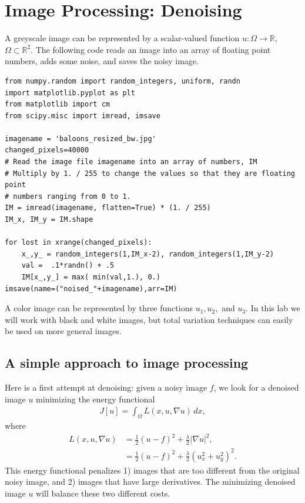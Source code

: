\section*{Image Processing: Denoising}
A greyscale image can be represented by a scalar-valued function $u:\Omega \to \mathbb{R}$, $\Omega \subset \mathbb{R}^2$. The following code reads an image into an array of floating point numbers, adds some noise, and saves the noisy image. 
\begin{lstlisting}
from numpy.random import random_integers, uniform, randn
import matplotlib.pyplot as plt
from matplotlib import cm
from scipy.misc import imread, imsave

imagename = 'baloons_resized_bw.jpg'
changed_pixels=40000
# Read the image file imagename into an array of numbers, IM
# Multiply by 1. / 255 to change the values so that they are floating point
# numbers ranging from 0 to 1.
IM = imread(imagename, flatten=True) * (1. / 255)
IM_x, IM_y = IM.shape
	
for lost in xrange(changed_pixels):
	x_,y_ = random_integers(1,IM_x-2), random_integers(1,IM_y-2)
	val =  .1*randn() + .5
	IM[x_,y_] = max( min(val,1.), 0.)
imsave(name=("noised_"+imagename),arr=IM)	
\end{lstlisting}
A color image can be represented by three functions $u_1, u_2,$ and $u_3$. In this lab we will work with black and white images, but total variation techniques can easily be used on more general images. 

\subsection*{A simple approach to image processing}
Here is a first attempt at denoising: given a noisy image $f$, we look for a denoised image $u$ minimizing the energy functional 
\begin{align}
J[u] = \int_{\Omega} L(x,u,\nabla u) \, dx, \label{tv_images:diffusion}
\end{align}
where
\begin{align*}
L(x,u,\nabla u) &= \frac{1}{2}(u-f)^2 + \frac{\lambda}{2} | \nabla u|^2,\\
&= \frac{1}{2}(u-f)^2 + \frac{\lambda}{2} (u_x^2 + u_y^2)^2.
\end{align*}
This energy functional penalizes 1) images that are too different from the original noisy image, and 2) images that have large derivatives. The minimizing denoised image $u$ will balance these two different costs. 


